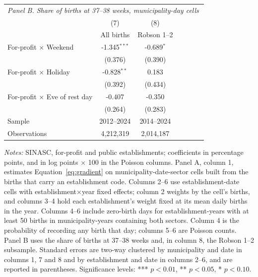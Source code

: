 \begin{table}[H]
{\begin{tabular}{lcccccc}
\midrule
\multicolumn{7}{l}{\emph{Panel B. Share of births at 37--38 weeks, municipality-day cells}} \\
\addlinespace[2pt]
 & (7) & (8) & & & & \\
 & All births & Robson 1--2 & & & & \\
\midrule
For-profit $\times$ Weekend & -1.345$^{***}$ & -0.689$^{*}$ & & & & \\
 & (0.376) & (0.390) & & & & \\
\addlinespace[2pt]
For-profit $\times$ Holiday & -0.828$^{**}$ & 0.183 & & & & \\
 & (0.392) & (0.434) & & & & \\
\addlinespace[2pt]
For-profit $\times$ Eve of rest day & -0.407 & -0.350 & & & & \\
 & (0.264) & (0.283) & & & & \\
\addlinespace[2pt]
\midrule
Sample & 2012--2024 & 2014--2024 & & & & \\
Observations & 4,212,319 & 2,014,187 & & & & \\
\bottomrule
\end{tabular}}
\begin{minipage}{\linewidth}\footnotesize
\textit{Notes:} SINASC, for-profit and public establishments; coefficients in percentage points, and in log points $\times$ 100 in the Poisson columns. Panel A, column 1, estimates Equation~\eqref{eq:gradient} on municipality-date-sector cells built from the births that carry an establishment code. Columns 2--6 use establishment-date cells with establishment$\times$year fixed effects; column 2 weights by the cell's births, and columns 3--4 hold each establishment's weight fixed at its mean daily births in the year. Columns 4--6 include zero-birth days for establishment-years with at least 50 births in municipality-years containing both sectors. Column 4 is the probability of recording any birth that day; columns 5--6 are Poisson counts. Panel B uses the share of births at 37--38 weeks and, in column 8, the Robson 1--2 subsample. Standard errors are two-way clustered by municipality and date in columns 1, 7 and 8 and by establishment and date in columns 2--6, and are reported in parentheses.
\newline
\footnotesize Significance levels: *** $p<0.01$, ** $p<0.05$, * $p<0.10$.
\end{minipage}
\end{table}
